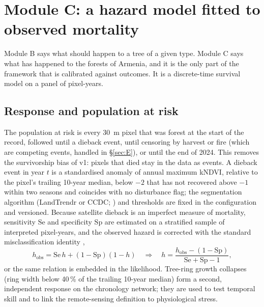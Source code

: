 \section{Module C: a hazard model fitted to observed mortality}\label{sec:C}

Module B says what should happen to a tree of a given type. Module C says what has happened to the forests of Armenia, and it is the only part of the framework that is calibrated against outcomes. It is a discrete-time survival model on a panel of pixel-years.

\subsection{Response and population at risk}
The population at risk is every 30~m pixel that was forest at the start of the record, followed until a dieback event, until censoring by harvest or fire (which are competing events, handled in \S\ref{sec:E}), or until the end of 2024. This removes the survivorship bias of v1: pixels that died stay in the data as events. A dieback event in year $t$ is a standardised anomaly of annual maximum kNDVI, relative to the pixel's trailing 10-year median, below $-2$ that has not recovered above $-1$ within two seasons and coincides with no disturbance flag; the segmentation algorithm (LandTrendr or CCDC; \citealt{Kennedy2010,Zhu2014}) and thresholds are fixed in the configuration and versioned. Because satellite dieback is an imperfect measure of mortality, sensitivity $\mathrm{Se}$ and specificity $\mathrm{Sp}$ are estimated on a stratified sample of interpreted pixel-years, and the observed hazard is corrected with the standard misclassification identity \citep{Rogan1978},
\begin{equation}\label{eq:rogan}
h_{\text{obs}}=\mathrm{Se}\,h+(1-\mathrm{Sp})(1-h)\quad\Longrightarrow\quad h=\frac{h_{\text{obs}}-(1-\mathrm{Sp})}{\mathrm{Se}+\mathrm{Sp}-1},
\end{equation}
or the same relation is embedded in the likelihood. Tree-ring growth collapses (ring width below 40\,\% of the trailing 10-year median) form a second, independent response on the chronology network; they are used to test temporal skill and to link the remote-sensing definition to physiological stress.

